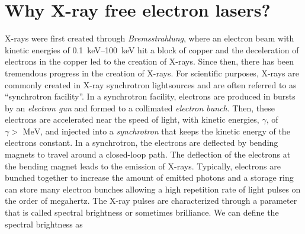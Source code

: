 \section{Why X-ray free electron lasers?}\label{sec:xfel}
X-rays were first created through \textit{Bremsstrahlung}, where an electron beam with kinetic energies of \SIrange{0.1}{100}{\kilo\electronvolt} hit a block of copper and the deceleration of electrons in the copper led to the creation of X-rays. Since then, there has been tremendous progress in the creation of X-rays. For scientific purposes, X-rays are commonly created in X-ray synchrotron lightsources and are often referred to as ``synchrotron facility''. In a synchrotron facility, electrons are produced in bursts by an \textit{electron gun} and formed to a collimated \textit{electron bunch}. Then, these electrons are accelerated near the speed of light, with kinetic energies, $\gamma$, of $\gamma>\text{ MeV}$, and injected into a \textit{synchrotron} that keeps the kinetic energy of the electrons constant. In a synchrotron, the electrons are deflected by bending magnets to travel around a closed-loop path. The deflection of the electrons at the bending magnet leads to the emission of X-rays. Typically, electrons are bunched together to increase the amount of emitted photons and a storage ring can store many electron bunches allowing a high repetition rate of light pulses on the order of megahertz. The X-ray pulses are characterized through a parameter that is called spectral brightness \citep{Mills-2005-IUCR} or sometimes brilliance. We can define the spectral brightness as \citep{Als-Nielson-2011-JWS}
